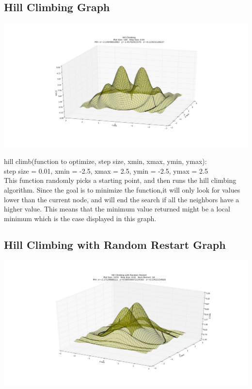 \documentclass{article}
\begin{document}
 \subsection{Hill Climbing Graph}
 \includegraphics[width=1.1\textwidth]{figure_1h.png}
	
	hill climb(function to optimize, step size, xmin, xmax, ymin, ymax):\\
	step size = 0.01, xmin = -2.5, xmax = 2.5, ymin = -2.5, ymax = 2.5\\
		
	This function randomly picks a starting point, and then runs the hill climbing algorithm. Since the goal is to minimize the function,it will only look for values lower than the current node, and will end the search if all the neighbors have a higher value. This means that the minimum value returned might be a local minimum which is the case displayed in this graph.\\

 
 \subsection{Hill Climbing with Random Restart Graph}
 \includegraphics[width=1.1\textwidth]{figure_2h.png}
\end{document}
